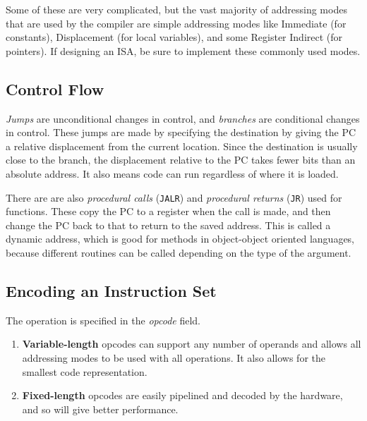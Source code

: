 \documentclass{article}
\begin{document}

Some of these are very complicated, but the vast majority of addressing modes that are used by the compiler are simple addressing modes like Immediate (for constants), Displacement (for local variables), and some Register Indirect (for pointers). If designing an ISA, be sure to implement these commonly used modes.

\subsection{Control Flow}

\textit{Jumps} are unconditional changes in control, and \textit{branches} are conditional changes in control. These jumps are made by specifying the destination by giving the PC a relative displacement from the current location. Since the destination is usually close to the branch, the displacement relative to the PC takes fewer bits than an absolute address. It also means code can run regardless of where it is loaded. 

There are are also \textit{procedural calls} (\texttt{JALR}) and \textit{procedural returns} (\texttt{JR}) used for functions. These copy the PC to a register when the call is made, and then change the PC back to that to return to the saved address. This is called a dynamic address, which is good for methods in object-object oriented languages, because different routines can be called depending on the type of the argument.

\subsection{Encoding an Instruction Set}

The operation is specified in the \textit{opcode} field. 

\begin{enumerate}

\item \textbf{Variable-length} opcodes can support any number of operands and allows all addressing modes to be used with all operations. It also allows for the smallest code representation.

\item \textbf{Fixed-length} opcodes are easily pipelined and decoded by the hardware, and so will give better performance.

\end{enumerate}
\end{document}
